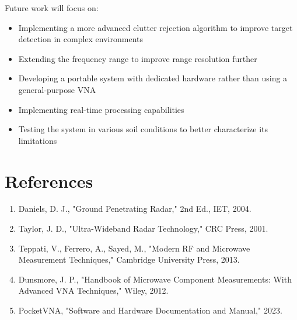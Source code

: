 \documentclass[11pt,a4paper]{article}
\begin{document}
Future work will focus on:

\begin{itemize}
    \item Implementing a more advanced clutter rejection algorithm to improve target detection in complex environments
    \item Extending the frequency range to improve range resolution further
    \item Developing a portable system with dedicated hardware rather than using a general-purpose VNA
    \item Implementing real-time processing capabilities
    \item Testing the system in various soil conditions to better characterize its limitations
\end{itemize}

\section{References}

\begin{enumerate}
    \item Daniels, D. J., "Ground Penetrating Radar," 2nd Ed., IET, 2004.
    \item Taylor, J. D., "Ultra-Wideband Radar Technology," CRC Press, 2001.
    \item Teppati, V., Ferrero, A., Sayed, M., "Modern RF and Microwave Measurement Techniques," Cambridge University Press, 2013.
    \item Dunsmore, J. P., "Handbook of Microwave Component Measurements: With Advanced VNA Techniques," Wiley, 2012.
    \item PocketVNA, "Software and Hardware Documentation and Manual," 2023.
\end{enumerate}
\end{document}
